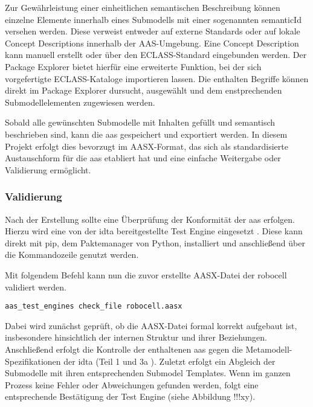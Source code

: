 Zur Gewährleistung einer einheitlichen semantischen Beschreibung können einzelne Elemente innerhalb eines Submodells mit einer sogenannten semanticId versehen werden.
Diese verweist entweder auf externe Standards oder auf lokale Concept Descriptions innerhalb der AAS-Umgebung.
Eine Concept Description kann manuell erstellt oder über den ECLASS-Standard eingebunden werden.
Der Package Explorer bietet hierfür eine erweiterte Funktion, bei der sich vorgefertigte ECLASS-Kataloge importieren lassen.
Die enthalten Begriffe können direkt im Package Explorer dursucht, ausgewählt und dem enstprechenden Submodellelementen zugewiesen werden.

Sobald alle gewünschten Submodelle mit Inhalten gefüllt und semantisch beschrieben sind, kann die \acs{aas} gespeichert und exportiert werden.
In diesem Projekt erfolgt dies bevorzugt im AASX-Format, das sich als standardisierte Austauschform für die \acs{aas} etabliert hat und eine einfache Weitergabe oder Validierung ermöglicht.




\subsubsection{Validierung}
Nach der Erstellung sollte eine Überprüfung der Konformität der \acs{aas} erfolgen.
Hierzu wird eine von der \acs{idta} bereitgestellte Test Engine eingesetzt \cite{TestEngine}. 
Diese kann direkt mit pip, dem Paktemanager von Python, installiert und anschließend über die Kommandozeile genutzt werden.

Mit folgendem Befehl kann nun die zuvor erstellte AASX-Datei der robocell validiert werden.
\begin{verbatim}
aas_test_engines check_file robocell.aasx
\end{verbatim}

Dabei wird zunächst geprüft, ob die AASX-Datei formal korrekt aufgebaut ist, insbesondere hinsichtlich der internen Struktur und ihrer Beziehungen.
Anschließend erfolgt die Kontrolle der enthaltenen \acs{aas} gegen die Metamodell-Spezifikationen der \acs{idta} (Teil 1 \cite{SpezifikationPart1} und 3a \cite{SpezifikationPart3a}).
Zuletzt erfolgt ein Abgleich der Submodelle mit ihren entsprechenden Submodel Templates.
Wenn im ganzen Prozess keine Fehler oder Abweichungen gefunden werden, folgt eine entsprechende Bestätigung der Test Engine (siehe Abbildung !!!xy).

